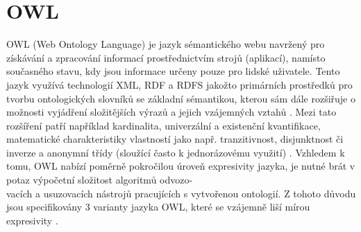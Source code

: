 \documentclass{projekt}
\begin{document}
\section{OWL}
\hspace{0.65cm}OWL (Web Ontology Language) je jazyk sémantického webu navržený pro získávání a zpracování informací prostřednictvím strojů (aplikací), namísto současného stavu, kdy jsou informace určeny pouze pro lidské uživatele. Tento jazyk využívá technologií XML, RDF a RDFS jakožto primárních prostředků pro tvorbu ontologických slovníků se základní sémantikou, kterou sám dále rozšiřuje o možnosti vyjádření složitějších výrazů a jejich vzájemných vztahů \cite{_11}. Mezi tato rozšíření patří například kardinalita, univerzální a existenční kvantifikace, matematické charakteristiky vlastností jako např. tranzitivnost, disjunktnost či inverze a anonymní třídy (sloužící  často k jednorázovému využití) \cite{_12}.
Vzhledem k tomu, OWL nabízí poměrně pokročilou úroveň expresivity jazyka, je nutné brát v potaz výpočetní složitost algoritmů odvozo-\\vacích a usuzovacích nástrojů pracujících s vytvořenou ontologií. Z tohoto důvodu jsou specifikovány 3 varianty jazyka OWL, které se vzájemně liší mírou expresivity \cite{_2}.
\end{document}
